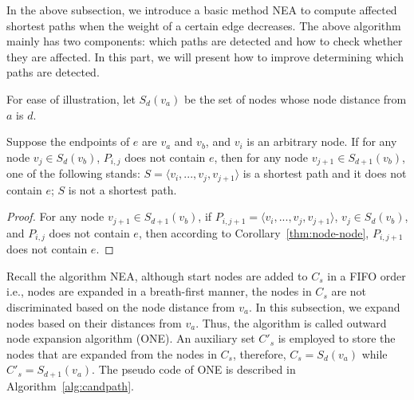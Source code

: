 In the above subsection, we introduce a basic method NEA to compute affected shortest paths when the weight of a certain edge decreases.
The above algorithm mainly has two components: which paths are detected and how to check whether they are affected.
In this part, we will present how to improve determining which paths are detected.

For ease of illustration, let $S_d(v_a)$ be the set of nodes whose node distance from $a$ is $d$.

\begin{corollary}
\label{thm:reduce-end-node}
Suppose the endpoints of $e$ are $v_a$ and $v_b$, and $v_i$ is an arbitrary node. If for any node $v_j \in S_d(v_b)$, $P_{i,j}$ does not contain $e$, then for any node $v_{j+1}\in S_{d+1}(v_b)$, one of the following stands: $S=\langle v_i,...,v_j,v_{j+1}\rangle$ is a shortest path and it does not contain $e$; $S$ is not a shortest path.
\end{corollary}
\begin{proof}
For any node $v_{j+1}\in S_{d+1}(v_b)$, if $P_{i,j+1}=\langle v_i,...,v_j,v_{j+1}\rangle$, $v_j\in S_d(v_b)$, and $P_{i,j}$ does not contain $e$, then according to Corollary~\ref{thm:node-node}, $P_{i,j+1}$ does not contain $e$.
\end{proof}

Recall the algorithm NEA, although start nodes are added to $C_s$ in a FIFO order i.e., nodes are expanded in a breath-first manner, the nodes in $C_s$ are not discriminated based on the node distance from $v_a$.
In this subsection, we expand nodes based on their distances from $v_a$. Thus, the algorithm is called outward node expansion algorithm (ONE).
An auxiliary set $C'_s$ is employed to store the nodes that are expanded from the nodes in $C_s$, therefore, $C_s=S_{d}(v_a)$ while $C'_s=S_{d+1}(v_a)$.
The pseudo code of ONE is described in Algorithm~\ref{alg:candpath}.

